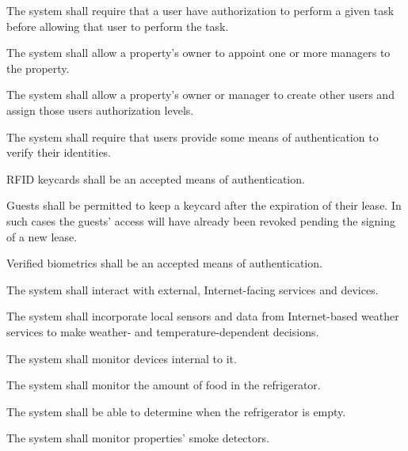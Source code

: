 \documentclass[letter,titlepage,oneside,english]{report}
\begin{document}
\begin{fr}
\item
  The system shall require that a user have authorization to perform a given task before allowing that user to perform the task.
  \begin{fr}
  \item
    The system shall allow a property's owner to appoint one or more managers to the property.
  \item
    The system shall allow a property's owner or manager to create other users and assign those users authorization levels.
  \item
    The system shall require that users provide some means of authentication to verify their identities.
    \begin{fr}
    \item
      RFID keycards shall be an accepted means of authentication.
      \begin{fr}
      \item
        Guests shall be permitted to keep a keycard after the expiration of their lease.
        In such cases the guests' access will have already been revoked pending the signing of a new lease.
      \end{fr}
    \item
      Verified biometrics shall be an accepted means of authentication.
    \end{fr}
  \end{fr}
\item
  The system shall interact with external, Internet-facing services and devices.
  \begin{fr}
  \item\label{fr:external:weather}
    The system shall incorporate local sensors and data from Internet-based weather services to make weather- and temperature-dependent decisions.
  \end{fr}
\item
  The system shall monitor devices internal to it.
  \begin{fr}
  \item
    The system shall monitor the amount of food in the refrigerator.
    \begin{fr}
    \item
      The system shall be able to determine when the refrigerator is empty.
    \end{fr}
  \item\label{fr:internal:smoke_detector}
    The system shall monitor properties' smoke detectors.
  \end{fr}

\end{fr}
\end{document}
